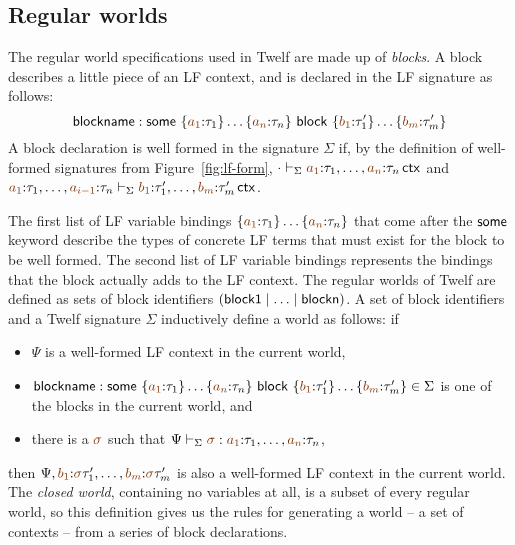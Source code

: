 \subsection{Regular worlds}
\label{sec:gen-regularworlds}

The
regular world specifications used in Twelf
\cite{schurmann00automating} are made up of {\it blocks}. A block
describes a little piece of an LF context, and is declared in the LF
signature as follows:
\[
 {\sf blockname} :
 {\sf some}~\{\lf{a_1}{:}\tau_1\}\ldots\{\lf{a_n}{:}\tau_n\}
~{\sf block}~\{\lf{b_1}{:}\tau'_1\}\ldots\{\lf{b_m}{:}\tau'_m\}
\]
A block declaration is well formed in the signature $\Sigma$ if, 
by the definition of well-formed signatures from Figure~\ref{fig:lf-form}, 
$\cdot \vdash_\Sigma \lf{a_1}{:}\tau_1,\ldots,\lf{a_{n}}{:} \tau_{n}\,{\sf ctx}$
and 
$\lf{a_1}{:}\tau_1,\ldots,\lf{a_{i-1}}{:} \tau_{n}
  \vdash_\Sigma \lf{b_1}{:}\tau'_1,\ldots,\lf{b_{m}}{:}\tau'_{m} \,{\sf ctx}$.

The first list of LF variable bindings
$\{\lf{a_1}{:}\tau_1\}\ldots\{\lf{a_n}{:}\tau_n\}$ that 
come after the ${\sf some}$ keyword describe the types
of concrete LF terms that must exist for the block to be well formed.
The second list of LF variable bindings represents the bindings that
the block actually adds to the LF context. The regular worlds of 
Twelf are defined as sets of block identifiers 
$({\sf block1} \mid \ldots \mid {\sf blockn})$. A set of block identifiers
and a Twelf signature $\Sigma$ inductively define a world as follows: if
\smallskip
\begin{itemize}
\item $\Psi$ is a well-formed
LF context in the current world, 
\item ${\sf blockname} :
 {\sf some}~\{\lf{a_1}{:}\tau_1\}\ldots\{\lf{a_n}{:}\tau_n\}
~{\sf block}~\{\lf{b_1}{:}\tau'_1\}\ldots\{\lf{b_m}{:}\tau'_m\} \in \Sigma$
 is one of the blocks in the current world, and
\item there is a $\lf{\sigma}$ such that
$\Psi \vdash_\Sigma \lf{\sigma} :
\lf{a_1}{:}\tau_1,\ldots,\lf{a_n}{:}\tau_n$, 
\end{itemize}
\smallskip then $\Psi, \lf{b_1}{:}\lf\sigma\tau'_1,\ldots,
\lf{b_m}{:}\lf\sigma\tau'_m$ is also a well-formed LF context in the
current world. The {\it closed world}, containing no variables at all,
 is a subset of every regular world, so this definition
gives us the rules for generating a world -- a set of contexts -- from
a series of block declarations.

